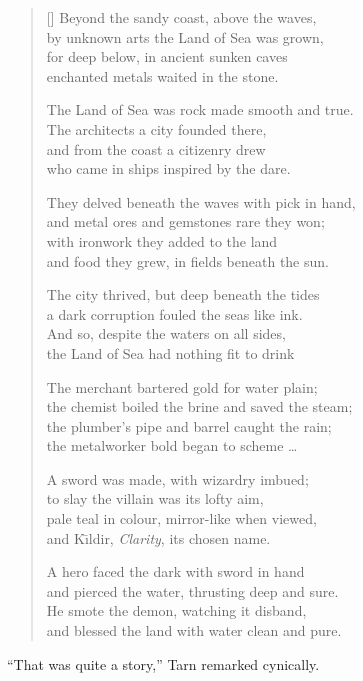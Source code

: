 \settowidth{\versewidth}{Beyond the Western coast, above the waves,}
\begin{verse}[\versewidth]
Beyond the sandy coast, above the waves,\\
by unknown arts the Land of Sea was grown,\\
for deep below, in ancient sunken caves\\
enchanted metals waited in the stone.

The Land of Sea was rock made smooth and true.\\
The architects a city founded there,\\
and from the coast a citizenry drew\\
who came in ships inspired by the dare.

They delved beneath the waves with pick in hand,\\
and metal ores and gemstones rare they won;\\
with ironwork they added to the land\\
and food they grew, in fields beneath the sun.

The city thrived, but deep beneath the tides\\
a dark corruption fouled the seas like ink.\\
And so, despite the waters on all sides,\\
the Land of Sea had nothing fit to drink

The merchant bartered gold for water plain;\\
the chemist boiled the brine and saved the steam;\\
the plumber's pipe and barrel caught the rain;\\
the metalworker bold began to scheme \ldots{}

A sword was made, with wizardry imbued;\\
to slay the villain was its lofty aim,\\
pale teal in colour, mirror-like when viewed,\\
and K\=\i{}ldir, \emph{Clarity}, its chosen name.

A hero faced the dark with sword in hand\\
and pierced the water, thrusting deep and sure.\\
He smote the demon, watching it disband,\\
and blessed the land with water clean and pure.
\end{verse}

``That was quite a story,'' Tarn remarked cynically.

